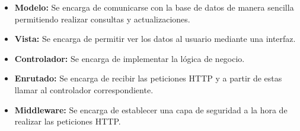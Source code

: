 \begin{itemize}
    \item \textbf{Modelo:} Se encarga de comunicarse con la base de datos de manera sencilla permitiendo realizar consultas y actualizaciones.
    \item \textbf{Vista:} Se encarga de permitir ver los datos al usuario mediante una interfaz.
    \item \textbf{Controlador:} Se encarga de implementar la lógica de negocio.
    \item \textbf{Enrutado:} Se encarga de recibir las peticiones HTTP y a partir de estas llamar al controlador correspondiente.
    \item \textbf{Middleware:} Se encarga de establecer una capa de seguridad a la hora de realizar las peticiones HTTP.
\end{itemize}

